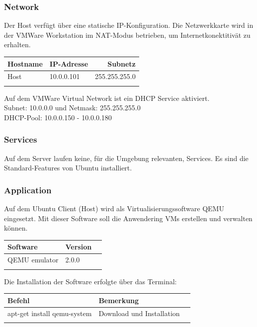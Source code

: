 \documentclass[a4,12pt]{scrartcl}
\begin{document}
\subsubsection{Network}
Der Host verfügt über eine statische IP-Konfiguration. Die Netzwerkkarte wird in der VMWare Workstation im NAT-Modus betrieben, um Internetkonektitivät zu erhalten.  
\begin{center}
    \begin{tabular}{@{} l l r@{}}\toprule    
    {Hostname} & {IP-Adresse} & {Subnetz}\\ \midrule
    Host & 10.0.0.101 & 255.255.255.0\\ \addlinespace
    \bottomrule
    \end{tabular}
\end{center}
Auf dem VMWare Virtual Network ist ein DHCP Service aktiviert. \\
Subnet: 10.0.0.0 und Netmask: 255.255.255.0 \\
DHCP-Pool: 10.0.0.150 - 10.0.0.180

\subsubsection{Services}
Auf dem Server laufen keine, für die Umgebung relevanten, Services. Es sind die Standard-Features von Ubuntu installiert.  

\subsubsection{Application}
Auf dem Ubuntu Client (Host) wird als Virtualisierungssoftware QEMU eingesetzt. Mit dieser Software soll die Anwendering VMs erstellen und verwalten können. 
\begin{center}
    \begin{tabular}{@{} l l r@{}}\toprule    
    {Software} & {Version}\\ \midrule
    QEMU emulator & 2.0.0\\ \addlinespace
    \bottomrule
    \end{tabular}
\end{center}
Die Installation der Software erfolgte über das Terminal: 
\begin{center}
    \begin{tabular}{@{} l l r@{}}\toprule    
    {Befehl} & {Bemerkung}\\ \midrule
    apt-get install qemu-system & Download und Installation\\
     \addlinespace
    \bottomrule
    \end{tabular}
\end{center}
\end{document}
